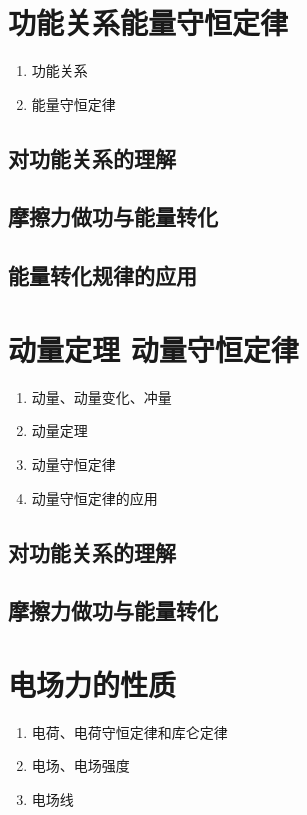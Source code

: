 \documentclass[cn,11pt, simple]{elegantbook}
\begin{document}
\chapter{功能关系能量守恒定律}
\begin{enumerate}
   \item 功能关系
   \item 能量守恒定律
\end{enumerate}

\clearpage\section{对功能关系的理解}

\clearpage\section{摩擦力做功与能量转化}

\clearpage\section{能量转化规律的应用}


\chapter{动量定理 动量守恒定律}
\begin{enumerate}
   \item 动量、动量变化、冲量
   \item 动量定理
   \item 动量守恒定律
   \item 动量守恒定律的应用
\end{enumerate}

\clearpage\section{对功能关系的理解}

\clearpage\section{摩擦力做功与能量转化}


\chapter{电场力的性质}
\begin{enumerate}
   \item 电荷、电荷守恒定律和库仑定律
   \item 电场、电场强度
   \item 电场线
\end{enumerate}
\end{document}
